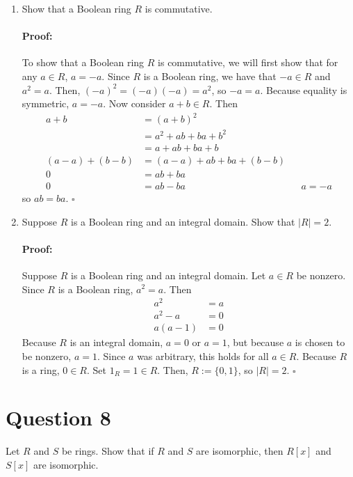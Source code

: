 \documentclass [12pt] {article}
\newenvironment{proof}{\paragraph{Proof:}}{\hfill$\square$}
\begin{document}
\begin{enumerate}
    \item Show that a Boolean ring $R$ is commutative. \vspace{-12pt}

        \begin{proof}
            To show that a Boolean ring $R$ is commutative, we will first show that for any 
            $a \in R$, $a = -a$. Since $R$ is a Boolean ring, we have that
            $-a \in R$ and $a^2 = a$. Then, $(-a)^2 = (-a)(-a) = a^2$, so $-a = a$. Because equality
            is symmetric, $a = -a$. Now consider $a + b \in R$. Then
            \begin{align*}
                a + b &= (a + b)^2 \\
                      &= a^2 + ab + ba + b^2 \\
                      &= a + ab + ba + b \\
                (a - a) + (b - b) &= (a - a) + ab + ba + (b - b) \\
                0 &= ab + ba \\
                0 &= ab - ba && a = -a
            \end{align*}
            so $ab = ba$.
        \end{proof}

    \item Suppose $R$ is a Boolean ring and an integral domain. Show that $|R|=2$. \vspace{-12pt}

        \begin{proof}
            Suppose $R$ is a Boolean ring and an integral domain. Let $a \in R$ be nonzero. Since 
            $R$ is a Boolean ring, $a^2 = a$. Then
            \begin{align*}
                a^2 &= a \\
                a^2 - a &= 0 \\
                a(a - 1) &= 0
            \end{align*}
            Because $R$ is an integral domain, $a = 0$ or $a = 1$, but because $a$ is chosen to be 
            nonzero, $a = 1$. Since $a$ was arbitrary, this holds for all $a \in R$. 
            Because $R$ is a ring, $0 \in R$. Set $1_R = 1 \in R$. Then, $R := \{ 0, 1 \}$, so 
            $|R| = 2$.
        \end{proof}
\end{enumerate} 
\newpage

\section*{Question 8}
Let $R$ and $S$ be rings. Show that if $R$ and $S$ are isomorphic, then $R[x]$ and $S[x]$ are isomorphic. 
\end{document}
